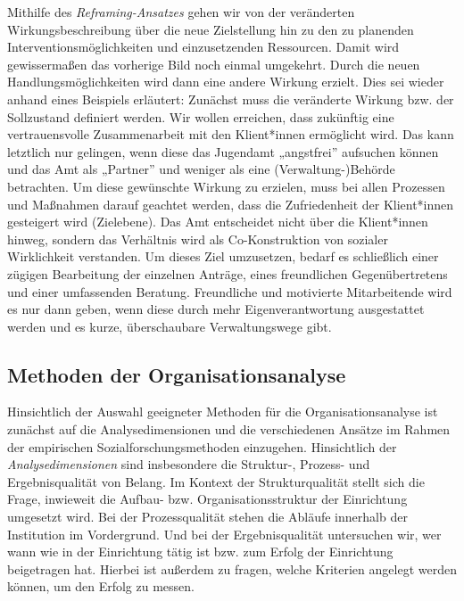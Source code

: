 \documentclass[
  letterpaper,
]{book}
\begin{document}
Mithilfe des \emph{Reframing-Ansatzes} gehen wir von der veränderten
Wirkungsbeschreibung über die neue Zielstellung hin zu den zu planenden
Interventionsmöglichkeiten und einzusetzenden Ressourcen. Damit wird
gewissermaßen das vorherige Bild noch einmal umgekehrt. Durch die neuen
Handlungsmöglichkeiten wird dann eine andere Wirkung erzielt. Dies sei
wieder anhand eines Beispiels erläutert: Zunächst muss die veränderte
Wirkung bzw. der Sollzustand definiert werden. Wir wollen erreichen,
dass zukünftig eine vertrauensvolle Zusammenarbeit mit den Klient*innen
ermöglicht wird. Das kann letztlich nur gelingen, wenn diese das
Jugendamt „angstfrei'' aufsuchen können und das Amt als „Partner'' und
weniger als eine (Verwaltung-)Behörde betrachten. Um diese gewünschte
Wirkung zu erzielen, muss bei allen Prozessen und Maßnahmen darauf
geachtet werden, dass die Zufriedenheit der Klient*innen gesteigert wird
(Zielebene). Das Amt entscheidet nicht über die Klient*innen hinweg,
sondern das Verhältnis wird als Co-Konstruktion von sozialer
Wirklichkeit verstanden. Um dieses Ziel umzusetzen, bedarf es
schließlich einer zügigen Bearbeitung der einzelnen Anträge, eines
freundlichen Gegenübertretens und einer umfassenden Beratung.
Freundliche und motivierte Mitarbeitende wird es nur dann geben, wenn
diese durch mehr Eigenverantwortung ausgestattet werden und es kurze,
überschaubare Verwaltungswege gibt.

\subsection{Methoden der
Organisationsanalyse}\label{methoden-der-organisationsanalyse}

Hinsichtlich der Auswahl geeigneter Methoden für die
Organisationsanalyse ist zunächst auf die Analysedimensionen und die
verschiedenen Ansätze im Rahmen der empirischen Sozialforschungsmethoden
einzugehen. Hinsichtlich der \emph{Analysedimensionen} sind insbesondere
die Struktur-, Prozess- und Ergebnisqualität von Belang. Im Kontext der
Strukturqualität stellt sich die Frage, inwieweit die Aufbau- bzw.
Organisationsstruktur der Einrichtung umgesetzt wird. Bei der
Prozessqualität stehen die Abläufe innerhalb der Institution im
Vordergrund. Und bei der Ergebnisqualität untersuchen wir, wer wann wie
in der Einrichtung tätig ist bzw. zum Erfolg der Einrichtung beigetragen
hat. Hierbei ist außerdem zu fragen, welche Kriterien angelegt werden
können, um den Erfolg zu messen.
\end{document}
